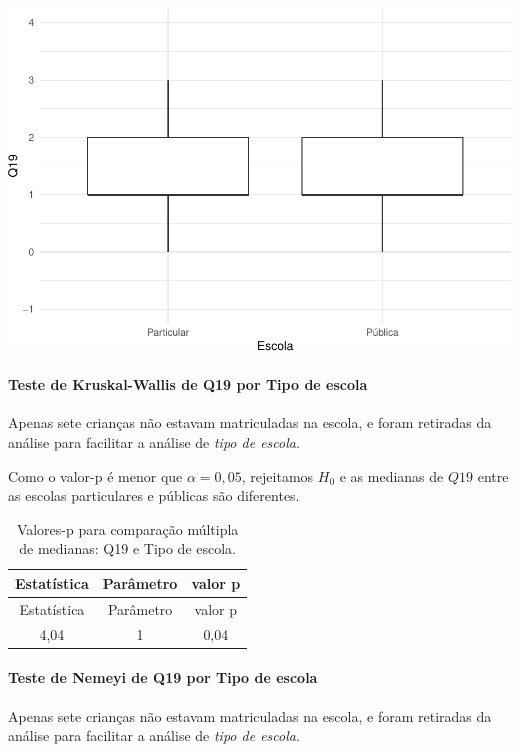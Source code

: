 \documentclass[]{article}
\let\oldparagraph\paragraph
\renewcommand{\paragraph}[1]{\oldparagraph{#1}\mbox{}}
\begin{document}
\begin{center}\includegraphics[width=0.75\linewidth]{relatorio_files/figure-latex/unnamed-chunk-282-1} \end{center}

\hypertarget{teste-de-kruskal-wallis-de-q19-por-tipo-de-escola}{%
\paragraph{Teste de Kruskal-Wallis de Q19 por Tipo de escola}\label{teste-de-kruskal-wallis-de-q19-por-tipo-de-escola}}

Apenas sete crianças não estavam matriculadas na escola, e foram retiradas da análise para facilitar a análise de \emph{tipo de escola}.

Como o valor-p é menor que \(\alpha=0,05\), rejeitamos \(H_0\) e as medianas de \(Q19\) entre as escolas particulares e públicas são diferentes.

\begin{longtable}[]{@{}ccc@{}}
\caption{\label{tab:unnamed-chunk-283}Valores-p para comparação múltipla de medianas: Q19 e Tipo de escola.}\tabularnewline
\toprule
Estatística & Parâmetro & valor p\tabularnewline
\midrule
\endfirsthead
\toprule
Estatística & Parâmetro & valor p\tabularnewline
\midrule
\endhead
4,04 & 1 & 0,04\tabularnewline
\bottomrule
\end{longtable}

\hypertarget{teste-de-nemeyi-de-q19-por-tipo-de-escola}{%
\paragraph{Teste de Nemeyi de Q19 por Tipo de escola}\label{teste-de-nemeyi-de-q19-por-tipo-de-escola}}

Apenas sete crianças não estavam matriculadas na escola, e foram retiradas da análise para facilitar a análise de \emph{tipo de escola}.
\end{document}
